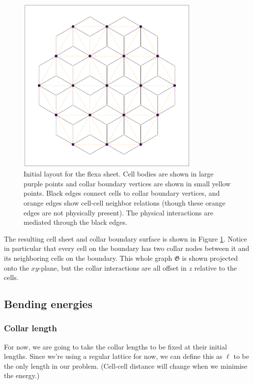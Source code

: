 \documentclass[draft]{article}
\begin{document}
\begin{figure}[hbtp]
    \centering
    \includegraphics[width=0.8\textwidth]{figures/numerical/layout_init.png}
    \caption{Initial layout for the flexa sheet. Cell bodies are shown in large purple points and collar boundary vertices are shown in small yellow points. Black edges connect cells to collar boundary vertices, and orange edges show cell-cell neighbor relations (though these orange edges are not physically present). The physical interactions are mediated through the black edges.}
    \label{fig:layout_init}
\end{figure}

The resulting cell sheet and collar boundary surface is shown in Figure \ref{fig:layout_init}. Notice in particular that every cell on the boundary has two collar nodes between it and its neighboring cells on the boundary. This whole graph $\mathfrak{G}$ is shown projected onto the $xy$-plane, but the collar interactions are all offset in $z$ relative to the cells. 

\subsection{Bending energies}

\subsubsection{Collar length}
For now, we are going to take the collar lengths to be fixed at their initial lengths. Since we're using a regular lattice for now, we can define this as $\ell$ to be the only length in our problem. (Cell-cell distance will change when we minimise the energy.)
\end{document}
